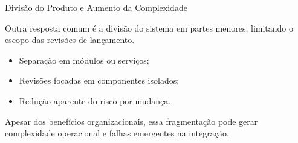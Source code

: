 \documentclass[9pt]{beamer}
\begin{document}
\begin{frame}{Divisão do Produto e Aumento da Complexidade}

Outra resposta comum é a divisão do sistema em partes menores,
limitando o escopo das revisões de lançamento.

\begin{itemize}
  \item Separação em módulos ou serviços;
  \item Revisões focadas em componentes isolados;
  \item Redução aparente do risco por mudança.
\end{itemize}

Apesar dos benefícios organizacionais, essa fragmentação pode gerar
complexidade operacional e falhas emergentes na integração.
\end{frame}
\end{document}
